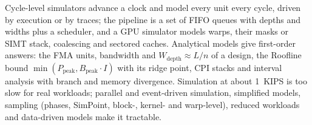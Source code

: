 \documentclass[../main.tex]{subfiles}
\begin{document}
\begin{keypoint}
  Cycle-level simulators advance a clock and model every unit every
  cycle, driven by execution or by traces; the pipeline is a set of
  FIFO queues with depths and widths plus a scheduler, and a GPU
  simulator models warps, their masks or SIMT stack, coalescing and
  sectored caches.  Analytical models give first-order answers: the FMA
  units, bandwidth and $W_{\text{depth}} \approx L/n$ of a design, the
  Roofline bound $\min(P_{\text{peak}}, B_{\text{peak}} \cdot I)$ with
  its ridge point, CPI stacks and interval analysis with branch and
  memory divergence.  Simulation at about 1~KIPS is too slow for real
  workloads; parallel and event-driven simulation, simplified models,
  sampling (phases, SimPoint, block-, kernel- and warp-level), reduced
  workloads and data-driven models make it tractable.
\end{keypoint}
\end{document}

